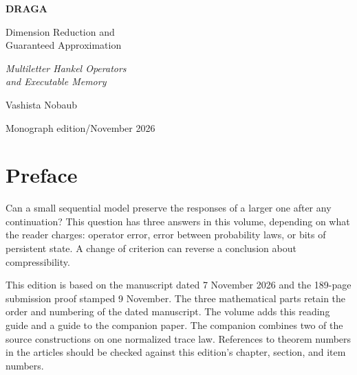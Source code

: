 \documentclass[11pt,oneside,openany]{book}
\theoremstyle{definition}
\theoremstyle{remark}
\begin{document}
\frontmatter
\begin{titlepage}
\vspace*{18mm}{\sffamily\large DATAR CONSULTING}\par
\vspace{17mm}\noindent{\color{blue!45!black}\rule{\linewidth}{1.4pt}}\par\vspace{6mm}
{\fontsize{46}{52}\selectfont\bfseries DRAGA}\par\vspace{6mm}
{\LARGE Dimension Reduction and\\[2pt] Guaranteed Approximation}\par\vspace{8mm}
{\Large\itshape Multiletter Hankel Operators\\ and Executable Memory}\par
\vfill{\Large Vashista Nobaub}\par\vspace{3mm}
{\sffamily Monograph edition\enspace /\enspace November 2026}\par
\end{titlepage}
\chapter*{Preface}
Can a small sequential model preserve the responses of a larger one after any continuation?
This question has three answers in this volume, depending on what the reader charges:
operator error, error between probability laws, or bits of persistent state.
A change of criterion can reverse a conclusion about compressibility.

This edition is based on the manuscript dated 7 November 2026 and the 189-page submission
proof stamped 9 November. The three mathematical parts retain the order and numbering of
the dated manuscript. The volume adds this reading guide and a guide to the companion paper.
The companion combines two of the source constructions on one normalized trace law.
References to theorem numbers in the articles should be checked against this edition's
chapter, section, and item numbers.
\end{document}
